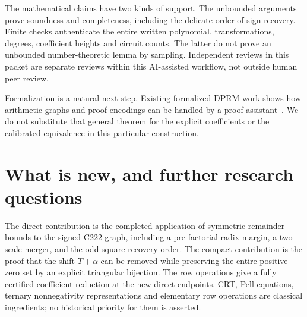 \documentclass[11pt]{article}
\begin{document}
The mathematical claims have two kinds of support. The unbounded
arguments prove soundness and completeness, including the delicate order
of sign recovery. Finite checks authenticate the entire written
polynomial, transformations, degrees, coefficient heights and circuit
counts. The latter do not prove an unbounded number-theoretic lemma by
sampling. Independent reviews in this packet are separate reviews within
this AI-assisted workflow, not outside human peer review.

Formalization is a natural next step. Existing formalized DPRM work shows
how arithmetic graphs and proof encodings can be handled by a proof
assistant~\cite{dprmformal}. We do not substitute that general theorem
for the explicit coefficients or the calibrated equivalence in this
particular construction.

\section{What is new, and further research questions}

The direct contribution is the completed application of symmetric
remainder bounds to the signed C222 graph, including a pre-factorial radix
margin, a two-scale merger, and the odd-square recovery order. The compact
contribution is the proof that the shift $T+\alpha$ can be removed while
preserving the entire positive zero set by an explicit triangular
bijection. The row operations give a fully certified coefficient reduction
at the new direct endpoints. CRT, Pell equations, ternary nonnegativity
representations and elementary row operations are classical ingredients;
no historical priority for them is asserted.
\end{document}
